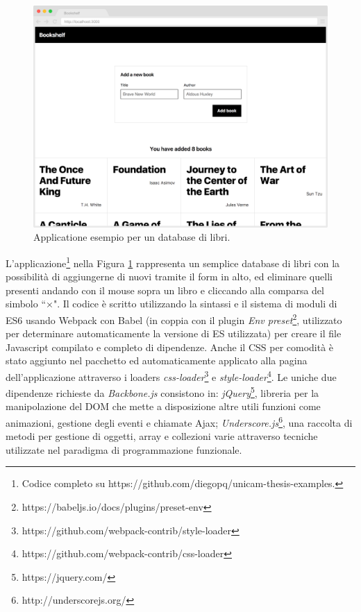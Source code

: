 \begin{figure}[h]
\centering
\includegraphics[width=14cm]{./images/bookshelfApplication1}
\caption{Applicatione esempio per un database di libri.}
\label{bookshelfApplication1}
\end{figure}

L'applicazione\footnote{Codice completo su https://github.com/diegopq/unicam-thesis-examples.} nella Figura \ref{bookshelfApplication1} rappresenta un semplice database di libri con la possibilità di aggiungerne di nuovi tramite il form in alto, ed eliminare quelli presenti andando con il mouse sopra un libro e cliccando alla comparsa del simbolo “×".
Il codice è scritto utilizzando la sintassi e il sistema di moduli di ES6 usando Webpack con Babel (in coppia con il plugin \textit{Env preset}\footnote{https://babeljs.io/docs/plugins/preset-env}, utilizzato per determinare automaticamente la versione di ES utilizzata) per creare il file Javascript compilato e completo di dipendenze. Anche il CSS per comodità è stato aggiunto nel pacchetto ed automaticamente applicato alla pagina dell'applicazione attraverso i loaders \textit{css-loader}\footnote{https://github.com/webpack-contrib/style-loader} e \textit{style-loader}\footnote{https://github.com/webpack-contrib/css-loader}.
Le uniche due dipendenze richieste da \textit{Backbone.js} consistono in: \textit{jQuery}\footnote{https://jquery.com/}, libreria per la manipolazione del DOM che mette a disposizione altre utili funzioni come animazioni, gestione degli eventi e chiamate Ajax; \textit{Underscore.js}\footnote{http://underscorejs.org/}, una raccolta di metodi per gestione di oggetti, array e collezioni varie attraverso tecniche utilizzate nel paradigma di programmazione funzionale.

